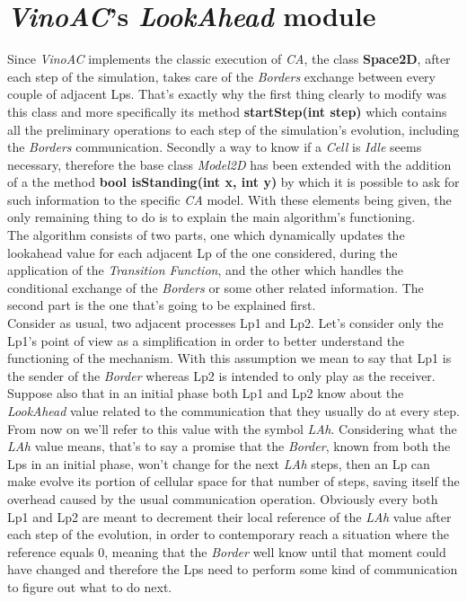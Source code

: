 \documentclass[12pt,a4paper,fleqn]{report}
\begin{document}
\section{\textit{VinoAC}'s \textit{LookAhead} module}
Since \textit{VinoAC} implements the classic execution of \textit{CA}, the class \textbf{Space2D}, after each step of the simulation, takes care of the \textit{Borders} exchange between every couple of adjacent Lps. That's exactly why the first thing clearly to modify was this class and more specifically its method \textbf{startStep(int step)} which contains all the preliminary operations to each step of the simulation's evolution, including the \textit{Borders} communication. Secondly a way to know if a \textit{Cell} is \textit{Idle} seems necessary, therefore the base class \textit{Model2D} has been extended with the addition of a the method \textbf{bool isStanding(int x, int y)} by which it is possible to ask for such information to the specific \textit{CA} model. With these elements being given, the only remaining thing to do is to explain the main algorithm's functioning. \\
The algorithm consists of two parts, one which dynamically updates the lookahead value for each adjacent Lp of the one considered, during the application of the \textit{Transition Function}, and the other which handles the conditional exchange of the \textit{Borders} or some other related information. The second part is the one that's going to be explained first. \\
Consider as usual, two adjacent processes Lp1 and Lp2. Let's consider only the Lp1's point of view as a simplification in order to better understand the functioning of the mechanism. With this assumption we mean to say that Lp1 is the sender of the \textit{Border} whereas Lp2 is intended to only play as the receiver. Suppose also that in an initial phase both Lp1 and Lp2 know about the \textit{LookAhead} value related to the communication that they usually do at every step. From now on we'll refer to this value with the symbol \textit{LAh}. Considering what the \textit{LAh} value means, that's to say a promise that the \textit{Border}, known from both the Lps in an initial phase, won't change for the next \textit{LAh} steps, then an Lp can make evolve its portion of cellular space for that number of steps, saving itself the overhead caused by the usual communication operation. Obviously every both Lp1 and Lp2 are meant to decrement their local reference of the \textit{LAh} value after each step of the evolution, in order to contemporary reach a situation where the reference equals 0, meaning that the \textit{Border} well know until that moment could have changed and therefore the Lps need to perform some kind of communication to figure out what to do next. 
\end{document}
